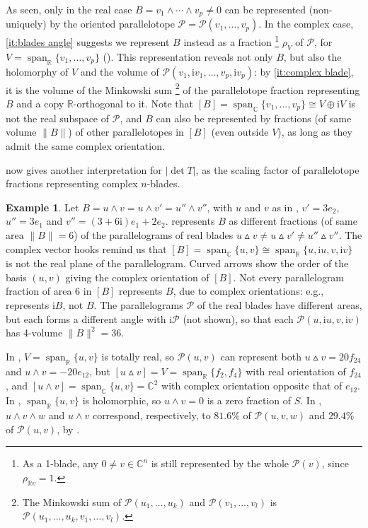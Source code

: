 \documentclass{birkjour}
\newcommand{\OMIT}[1]{\todo[color=gray!30]{#1}}  %
\theoremstyle{definition}
\newtheorem{example}[theorem]{Example}
\def\R			{\mathds{R}}
\def\C			{\mathds{C}}
\def\PP			{\mathcal{P}}
\def\im	 					{\mathrm{i}}				%
\def\rwedge			{\mathbin{\vartriangle}}
\def\cwedge			{\wedge}
\DeclareMathOperator{\Span}{span}
\begin{document}
As seen,
	\OMIT{\Cref{sc:blades}}
only in the real case $B = v_1 \cwedge \cdots \cwedge v_p \neq 0$ can be represented (non-uniquely) by the oriented parallelotope $\PP = \PP(v_1,\ldots,v_p)$.
In the complex case, \ref{it:blades angle} suggests we represent $B$ instead as a fraction%
	\footnote{As a 1-blade, any $0 \neq v \in \C^n$ is still represented by the whole $\PP(v)$, since $\rho_{\R v}=1$.}
$\rho_V$ of $\PP$, for $V=\Span_\R \{v_1,\ldots,v_p\}$ ().
This representation reveals not only $B$, but also the holomorphy of $V$ and the volume of $\PP(v_1,\im v_1,\ldots,v_p,\im v_p)$: by \ref{it:complex blade}, it is the volume of the Minkowski sum%
	\footnote{The Minkowski sum of $\PP(u_1,\ldots,u_k)$ and $\PP(v_1,\ldots,v_l)$ is $\PP(u_1,\ldots,u_k,v_1,\ldots,v_l)$.}
of the parallelotope fraction representing $B$ and a copy $\R$-orthogonal to it.
Note that $[B] = \Span_\C \{v_1,\ldots,v_p\} \cong V\oplus \im V$ is not the real subspace of $\PP$, 
and $B$ can also be represented by fractions (of same volume $\|B\|$) of other parallelotopes in $[B]$ (even outside $V$), as long as they admit the same complex orientation.



 now gives another interpretation for $|\det T|$, as the scaling factor of parallelotope fractions representing complex $n$-blades.



\begin{example}\label{ex:figura6}%
	Let $B = u\wedge v = u \wedge v' = u'' \wedge v''$, with $u$ and $v$ as in , $v' = 3 e_2$, $u'' = 3 e_1$ and $v'' = (3+6\im) e_1 + 2 e_2$.
	 represents $B$ as different fractions (of same area $\|B\|=6$) of the parallelograms of real blades $u\rwedge v \neq u \rwedge v' \neq u'' \rwedge v''$.
	The complex vector hooks 
	remind us that $[B] = \Span_\C\{u,v\} \cong \Span_\R\{u,\im u,v,\im v\}$ is not the real plane of the parallelogram.
	Curved arrows show the order of the basis $(u,v)$ giving the complex orientation of $[B]$.	
	Not every parallelogram fraction of area $6$ in $[B]$ represents $B$, due to complex orientations: e.g.,  represents $\im B$, not $B$.
	The parallelograms $\PP$ of the real blades have different areas, but each forms a different angle with $\im \PP$ (not shown), so that each $\PP(u,\im u,v,\im v)$ has 4-volume $\|B\|^2=36$.

	In , $V = \Span_\R\{u,v\}$ is totally real, so $\PP(u,v)$ can represent both $u \rwedge v = 20 f_{24}$ and $u \cwedge v  = -20 e_{12}$,
	but $[u \rwedge v] = V  = \Span_\R\{f_2,f_4\}$ with real orientation of $f_{24}$,
	and $[u \cwedge v] = \Span_\C \{u,v\} = \C^2$ with complex orientation opposite that of $e_{12}$.
	In , $\Span_\R\{u,v\}$ is holomorphic, so $u \wedge v = 0$ is a zero fraction of $S$.
	In , $u \wedge v \wedge w$ and $u \wedge v$ correspond, respectively, to $81.6\%$ of $\PP(u,v,w)$ and $29.4\%$ of $\PP(u,v)$, by .
\end{example}
\end{document}
